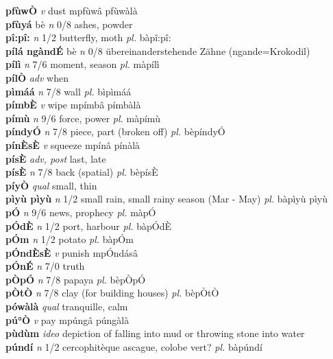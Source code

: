 \documentclass{article}
\begin{document}
{\bf pfùwÒ}  {\it v} dust   mpfùwâ   pfùwàlà   \\ 
{\bf pfùyá} bè {\it n} 0/8 ashes, powder         \\ 
{\bf pî:pî:}  {\it n} 1/2 butterfly, moth {\it pl.} bàpî:pî:         \\ 
{\bf pílá ngàndÉ } bè {\it n} 0/8 übereinanderstehende Zähne (ngande=Krokodil)         \\ 
{\bf pílì}  {\it n} 7/6 moment, season {\it pl.} màpílì         \\ 
{\bf pílÒ}  {\it adv} when         \\ 
{\bf pìmáá}  {\it n} 7/8 wall {\it pl.} bìpìmáá         \\ 
{\bf pímbÈ}  {\it v} wipe   mpímbâ   pímbàlà   \\ 
{\bf pímù}  {\it n} 9/6 force, power {\it pl.} màpímù         \\ 
{\bf píndyÓ}  {\it n} 7/8 piece, part (broken off) {\it pl.} bèpíndyÓ         \\ 
{\bf pínÈsÈ}  {\it v} squeeze   mpínâ   pínàlà   \\ 
{\bf písÈ}  {\it adv, post} last, late         \\ 
{\bf písÈ}  {\it n} 7/8 back (spatial) {\it pl.} bèpísÈ         \\ 
{\bf píyÒ}  {\it qual} small, thin         \\ 
{\bf pìyù pìyù}  {\it n} 1/2 small rain, small rainy season (Mar - May) {\it pl.} bàpìyù pìyù         \\ 
{\bf pÓ}  {\it n} 9/6 news, prophecy {\it pl.} màpÓ         \\ 
{\bf pÓdÈ}  {\it n} 1/2 port, harbour {\it pl.} bàpÓdÈ         \\ 
{\bf pÓm}  {\it n} 1/2 potato {\it pl.} bàpÓm         \\ 
{\bf pÓndÈsÈ}  {\it v} punish   mpÓndásâ      \\ 
{\bf pÓnÉ}  {\it n} 7/0 truth         \\ 
{\bf pÒpÓ}  {\it n} 7/8 papaya {\it pl.} bèpÒpÓ         \\ 
{\bf pÒtÒ}  {\it n} 7/8 clay (for building houses) {\it pl.} bèpÒtÒ         \\ 
{\bf pówàlà}  {\it qual} tranquille, calm         \\ 
{\bf pú°Ò}  {\it v} pay   mpúngâ   púngàlà   \\ 
{\bf pùdùm}  {\it ideo} depiction of falling into mud or throwing stone into water         \\ 
{\bf púndí}  {\it n} 1/2 cercophitèque ascague, colobe vert? {\it pl.} bàpúndí         \\ 
\end{document}
